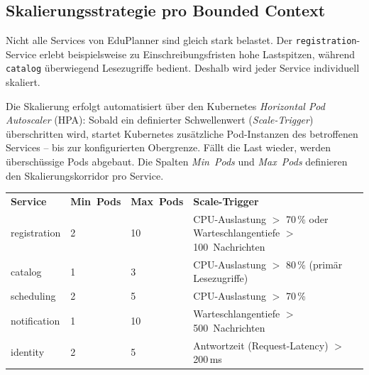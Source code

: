 \subsection{Skalierungsstrategie pro Bounded Context}

Nicht alle Services von EduPlanner sind gleich stark belastet.
Der \texttt{registration}-Service erlebt beispielsweise zu
Einschreibungsfristen hohe Lastspitzen, während \texttt{catalog}
überwiegend Lesezugriffe bedient. Deshalb wird jeder Service
individuell skaliert.

Die Skalierung erfolgt automatisiert über den Kubernetes
\emph{Horizontal Pod Autoscaler} (HPA): Sobald ein definierter
Schwellenwert (\emph{Scale-Trigger}) überschritten wird, startet
Kubernetes zusätzliche Pod-Instanzen des betroffenen Services --
bis zur konfigurierten Obergrenze. Fällt die Last wieder, werden
überschüssige Pods abgebaut. Die Spalten \emph{Min~Pods} und
\emph{Max~Pods} definieren den Skalierungskorridor pro Service.

\begin{tabularx}{\textwidth}{L{3cm} C{2cm} C{2cm} X}
  \color{white}\textbf{Service} &
  \color{white}\textbf{Min~Pods} &
  \color{white}\textbf{Max~Pods} &
  \color{white}\textbf{Scale-Trigger} \\

  registration & 2 & 10 &
  CPU-Auslastung $>$ 70\,\% oder
  Warteschlangentiefe $>$ 100~Nachrichten \\

  catalog & 1 & 3 &
  CPU-Auslastung $>$ 80\,\%
  (primär Lesezugriffe) \\

  scheduling & 2 & 5 &
  CPU-Auslastung $>$ 70\,\% \\

  notification & 1 & 10 &
  Warteschlangentiefe $>$ 500~Nachrichten \\

  identity & 2 & 5 &
  Antwortzeit (Request-Latency) $>$ 200\,ms \\
\end{tabularx}
